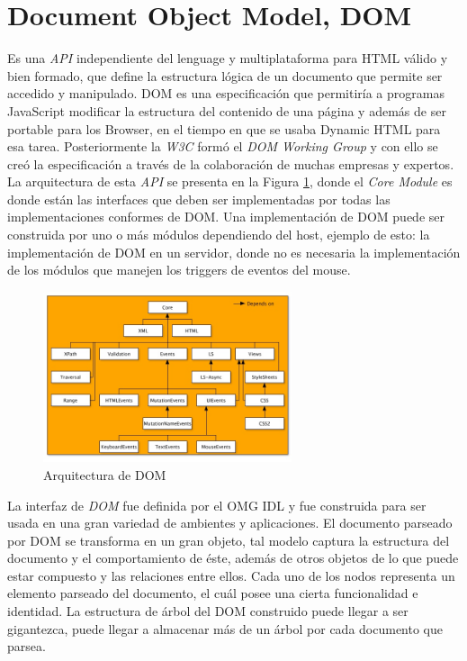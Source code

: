 \section{Document Object Model, DOM}
Es una \textit{API} independiente del lenguage y multiplataforma para HTML válido y bien formado, que define la estructura lógica de un documento que permite ser accedido y manipulado. DOM es una especificación que permitiría a programas JavaScript modificar la estructura del contenido de una página y además de ser portable para los Browser, en el tiempo en que se usaba Dynamic HTML para esa tarea. Posteriormente la \textit{W3C} \cite{w3c} formó el \textit{DOM Working Group} y con ello se creó la especificación a través de la colaboración de muchas empresas y expertos. La arquitectura de esta \textit{API} se presenta en la Figura \ref{fig:DOM}, donde el \textit{Core Module} es donde están las interfaces que deben ser implementadas por todas las implementaciones conformes de DOM. Una implementación de DOM puede ser construida por uno o más módulos dependiendo del host, ejemplo de esto: la implementación de DOM en un servidor, donde no es necesaria la implementación de los módulos que manejen los triggers de eventos del mouse.
        
\begin{figure}[h]
    \centering
    \includegraphics[width=0.65\textwidth]{figures/dom-architecture.jpg}
    \caption{Arquitectura de DOM \cite{w3c}}
    \label{fig:DOM}
\end{figure}
        
La interfaz de \textit{DOM} fue definida por el OMG IDL y fue construida para ser usada en una gran variedad de ambientes y aplicaciones. El documento parseado por DOM se transforma en un gran objeto, tal modelo captura la estructura del documento y el comportamiento de éste, además de otros objetos de lo que puede estar compuesto y las relaciones entre ellos. Cada uno de los nodos representa un elemento parseado del documento, el cuál posee una cierta funcionalidad e identidad. La estructura de árbol del DOM construido puede llegar a ser gigantezca, puede llegar a almacenar más de un árbol por cada documento que parsea. 
        
